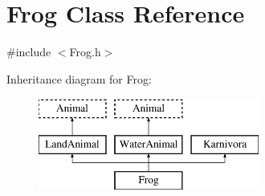 \hypertarget{classFrog}{\section{Frog Class Reference}
\label{classFrog}
}


{\ttfamily \#include $<$Frog.\-h$>$}

Inheritance diagram for Frog\-:\begin{figure}[H]
\begin{center}
\leavevmode
\includegraphics[height=3.000000cm]{classFrog}
\end{center}
\end{figure}
